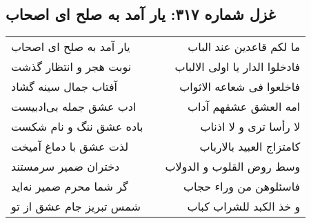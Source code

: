 \begin{center}
\section*{غزل شماره ۳۱۷: یار آمد به صلح ای اصحاب}
\label{sec:0317}
\begin{longtable}{l p{0.5cm} r}
یار آمد به صلح ای اصحاب
&&
ما لکم قاعدین عند الباب
\\
نوبت هجر و انتظار گذشت
&&
فادخلوا الدار یا اولی الالباب
\\
آفتاب جمال سینه گشاد
&&
فاخلعوا فی شعاعه الاثواب
\\
ادب عشق جمله بی‌ادبیست
&&
امه العشق عشقهم آداب
\\
باده عشق ننگ و نام شکست
&&
لا رأسا تری و لا اذناب
\\
لذت عشق با دماغ آمیخت
&&
کامتزاج العبید بالارباب
\\
دختران ضمیر سرمستند
&&
وسط روض القلوب و الدولاب
\\
گر شما محرم ضمیر نه‌اید
&&
فاسئلوهن من وراء حجاب
\\
شمس تبریز جام عشق از تو
&&
و خذ الکبد للشراب کباب
\\
\end{longtable}
\end{center}
